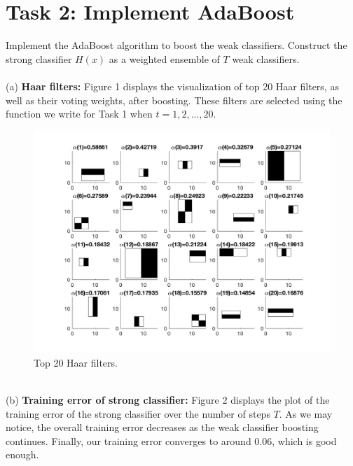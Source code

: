 \documentclass[10pt]{article}
\begin{document}
\section*{\large{Task 2: Implement AdaBoost}}
	Implement the AdaBoost algorithm to boost the weak classifiers. Construct the strong classifier $H(x)$ as a weighted ensemble of $T$ weak classifiers.\\\\
	(a) \textbf{Haar filters:} Figure 1 displays the visualization of top 20 Haar filters, as well as their voting weights, after boosting. These filters are selected using the function we write for Task 1 when $t=1,2,...,20$.\\
	\begin{figure}[ht]
		\includegraphics[scale = 0.25]{top_20_Haar_filter.jpg}
		\centering
		\caption{Top 20 Haar filters.}
		\label{1}
	\end{figure}\\
	(b) \textbf{Training error of strong classifier:} Figure 2 displays the plot of the training error of the strong classifier over the number of steps $T$. As we may notice, the overall training error decreases as the weak classifier boosting continues. Finally, our training error converges to around $0.06$, which is good enough.\\
\end{document}
